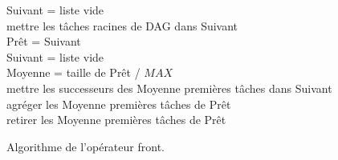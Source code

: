\begin{algorithm}
  {\sc Suivant} = liste vide \\
  mettre les tâches racines de DAG dans {\sc Suivant} \\
   {
    {\sc Prêt} = {\sc Suivant} \\
    {\sc Suivant} = liste vide \\
    {\sc Moyenne} = taille de {\sc Prêt} / $MAX$ \\

     {
      mettre les successeurs des {\sc Moyenne} premières tâches dans {\sc Suivant} \\
      agréger les {\sc Moyenne} premières tâches de {\sc Prêt} \\
      retirer les {\sc Moyenne} premières tâches de {\sc Prêt}
    }
  }
  \caption{Algorithme de l'opérateur front.}
  \label{algo:algo_F}
\end{algorithm}
